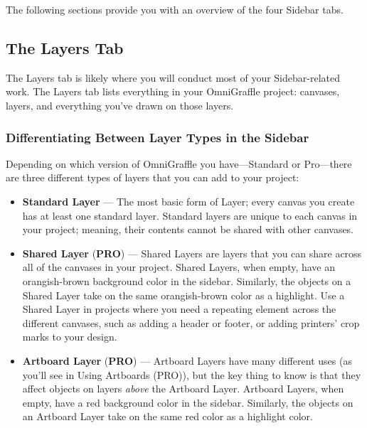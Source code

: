 \documentclass[../main.tex]{subfiles}
\begin{document}

The following sections provide you with an overview of the four Sidebar tabs.

\subsection{The Layers Tab }

The Layers tab is likely where you will conduct most of your Sidebar-related work. The Layers
tab lists everything in your OmniGraffle project: canvases, layers, and everything you've
drawn on those layers.

\subsubsection{Differentiating Between Layer Types in the Sidebar}

Depending on which version of OmniGraffle you have---Standard or Pro---there are three different
types of layers that you can add to your project:


\begin{itemize}
  \item \textbf{Standard Layer} --- The most basic form of Layer; every canvas you create has at
    least one standard layer. Standard layers are unique to each canvas in your project;
    meaning, their contents cannot be shared with other canvases.
\end{itemize}

\begin{ogpro}
  \begin{itemize}
    \item \textbf{Shared Layer} (\textbf{PRO}) --- Shared Layers are layers that you can share
      across all of the canvases in your project. Shared Layers, when empty, have an
      orangish-brown background color in the sidebar. Similarly, the objects on a Shared Layer
      take on the same orangish-brown color as a highlight. Use a Shared Layer in projects where
      you need a repeating element across the different canvases, such as adding a header or
      footer, or adding printers' crop marks to your design.
    \item \textbf{Artboard Layer} (\textbf{PRO}) --- Artboard Layers have many different uses
      (as you'll see in Using Artboards (PRO)), but the key thing to know is that they affect
      objects on layers \textit{above} the Artboard Layer. Artboard Layers, when empty, have a
      red background color in the sidebar. Similarly, the objects on an Artboard Layer take on
      the same red color as a highlight color.
  \end{itemize}
\end{ogpro}
\end{document}
